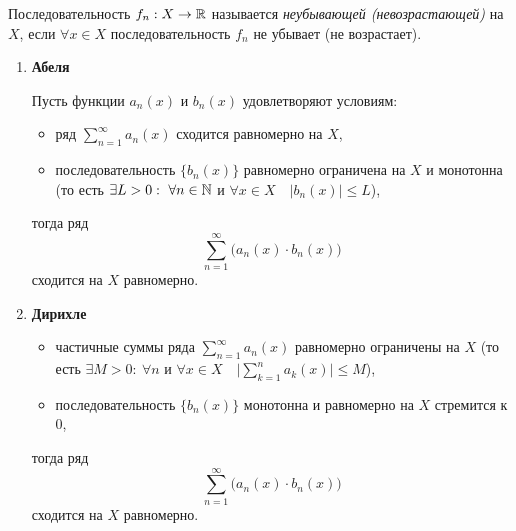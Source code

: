 \begin{definition}
    Последовательность $f_n: X \rightarrow\mathbb{R}$ называется \emph{неубывающей (невозрастающей)} на $X$, если $\forall x \in X$ последовательность $f_n$ не убывает (не возрастает).
\end{definition}

\begin{theorem}\label{theorem:6.9.1}\leavevmode
    \begin{enumerate}
        \item \textbf{Абеля}

              Пусть функции $a_n(x)$ и $b_n(x)$ удовлетворяют условиям:
              \begin{itemize}
                  \item ряд $\sum_{n=1}^{\infty}a_n(x)$ сходится равномерно на $X$,
                  \item последовательность $\big\{b_n(x)\big\}$ равномерно ограничена на $X$ и монотонна (то есть $\exists L > 0: \ \forall n \in \N$ и $\forall x \in X \quad \big|b_n(x)\big| \leqslant L$),
              \end{itemize}
              тогда ряд
              \[
                  \sum_{n=1}^{\infty}\big(a_n(x) \cdot b_n(x)\big)
              \]
              сходится на $X$ равномерно.

        \item \textbf{Дирихле}

              \begin{itemize}
                  \item частичные суммы ряда $\sum_{n=1}^{\infty}a_n(x)$ равномерно ограничены на $X$ (то есть $\exists M > 0: \ \forall n$ и $\forall x \in X \quad \big|\sum_{k=1}^{n}a_k(x)\big| \leqslant M$),
                  \item последовательность $ \big\{b_n(x)\big\} $ монотонна и равномерно на $ X $ стремится к $ 0 $,
              \end{itemize}
              тогда ряд
              \[
                  \sum_{n=1}^{\infty}\big(a_n(x) \cdot b_n(x)\big)
              \]
              сходится на $X$ равномерно.
    \end{enumerate}
\end{theorem}

